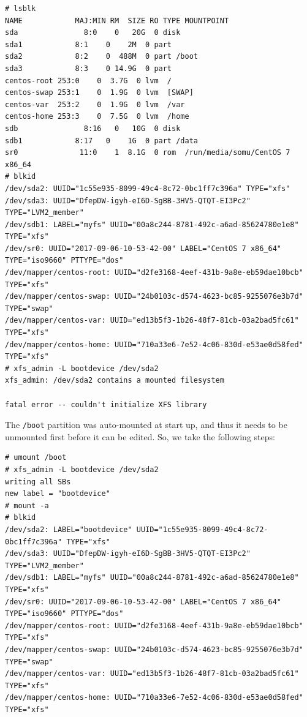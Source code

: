 \vspace{-15pt}
\begin{verbatim}
# lsblk
NAME            MAJ:MIN RM  SIZE RO TYPE MOUNTPOINT
sda               8:0    0   20G  0 disk 
sda1            8:1    0    2M  0 part 
sda2            8:2    0  488M  0 part /boot
sda3            8:3    0 14.9G  0 part 
centos-root 253:0    0  3.7G  0 lvm  /
centos-swap 253:1    0  1.9G  0 lvm  [SWAP]
centos-var  253:2    0  1.9G  0 lvm  /var
centos-home 253:3    0  7.5G  0 lvm  /home
sdb               8:16   0   10G  0 disk 
sdb1            8:17   0    1G  0 part /data
sr0              11:0    1  8.1G  0 rom  /run/media/somu/CentOS 7 x86_64
# blkid
/dev/sda2: UUID="1c55e935-8099-49c4-8c72-0bc1ff7c396a" TYPE="xfs" 
/dev/sda3: UUID="DfepDW-igyh-eI6D-SgBB-3HV5-QTQT-EI3Pc2" TYPE="LVM2_member" 
/dev/sdb1: LABEL="myfs" UUID="00a8c244-8781-492c-a6ad-85624780e1e8" TYPE="xfs" 
/dev/sr0: UUID="2017-09-06-10-53-42-00" LABEL="CentOS 7 x86_64" TYPE="iso9660" PTTYPE="dos" 
/dev/mapper/centos-root: UUID="d2fe3168-4eef-431b-9a8e-eb59dae10bcb" TYPE="xfs" 
/dev/mapper/centos-swap: UUID="24b0103c-d574-4623-bc85-9255076e3b7d" TYPE="swap" 
/dev/mapper/centos-var: UUID="ed13b5f3-1b26-48f7-81cb-03a2bad5fc61" TYPE="xfs" 
/dev/mapper/centos-home: UUID="710a33e6-7e52-4c06-830d-e53ae0d58fed" TYPE="xfs" 
# xfs_admin -L bootdevice /dev/sda2
xfs_admin: /dev/sda2 contains a mounted filesystem

fatal error -- couldn't initialize XFS library
\end{verbatim}
\vspace{-10pt}

\noindent
The \verb|/boot| partition was auto-mounted at start up, and thus it needs to be unmounted first before it can be edited. So, we take the following steps:

\vspace{-15pt}
\begin{verbatim}
# umount /boot
# xfs_admin -L bootdevice /dev/sda2
writing all SBs
new label = "bootdevice"
# mount -a
# blkid
/dev/sda2: LABEL="bootdevice" UUID="1c55e935-8099-49c4-8c72-0bc1ff7c396a" TYPE="xfs" 
/dev/sda3: UUID="DfepDW-igyh-eI6D-SgBB-3HV5-QTQT-EI3Pc2" TYPE="LVM2_member" 
/dev/sdb1: LABEL="myfs" UUID="00a8c244-8781-492c-a6ad-85624780e1e8" TYPE="xfs" 
/dev/sr0: UUID="2017-09-06-10-53-42-00" LABEL="CentOS 7 x86_64" TYPE="iso9660" PTTYPE="dos" 
/dev/mapper/centos-root: UUID="d2fe3168-4eef-431b-9a8e-eb59dae10bcb" TYPE="xfs" 
/dev/mapper/centos-swap: UUID="24b0103c-d574-4623-bc85-9255076e3b7d" TYPE="swap" 
/dev/mapper/centos-var: UUID="ed13b5f3-1b26-48f7-81cb-03a2bad5fc61" TYPE="xfs" 
/dev/mapper/centos-home: UUID="710a33e6-7e52-4c06-830d-e53ae0d58fed" TYPE="xfs" 
\end{verbatim}
\vspace{-10pt}


